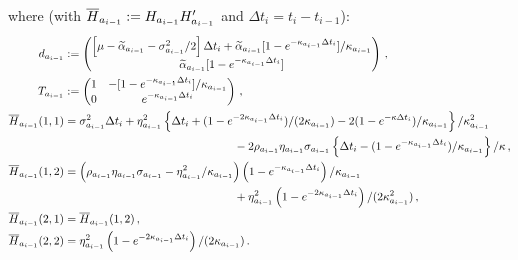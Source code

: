 where (with $\overline{H}_{a_{i-1}} := H_{a_{i-1}}H'_{a_{i-1}}$ and $\Delta t_i = t_i-t_{i-1}$):
\begin{align*}
d_{a_{i-1}} &\eqdef
\begin{pmatrix} \left[\mu- \widetilde{\alpha}_{a_{i-1}} - \sigma^2_{a_{i-1}}/2 \right] \Delta t_i + \widetilde{\alpha}_{a_{i-1}}[1-e^{-\kappa_{a_{i-1}} \Delta t_i}]/\kappa_{a_{i-1}}\\
\widetilde{\alpha}_{a_{i-1}} [1-e^{-\kappa_{a_{i-1}} \Delta t_i}] \end{pmatrix}\eqsp,\\
T_{a_{i-1}} &\eqdef
\begin{pmatrix} 1 & -[1-e^{-\kappa_{a_{i-1}} \Delta t_i}]/\kappa_{a_{i-1}} \\ 0 & e^{-\kappa_{a_{i-1}} \Delta t_i} \end{pmatrix} \eqsp,\\
\barH_{a_{i-1}}(1,1) &= \sigma^2_{a_{i-1}} \Delta t_i + \eta^2_{a_{i-1}}\left\{\Delta t_i + (1-e^{-2\kappa_{a_{i-1}} \Delta t_i})/(2\kappa_{a_{i-1}}) - 2(1-e^{-\kappa \Delta t_i})/\kappa_{a_{i-1}}\right\}/\kappa_{a_{i-1}}^2 \\
&\hspace{5.2cm} - 2\rho_{a_{i-1}} \eta_{a_{i-1}} \sigma_{a_{i-1}}\left\{ \Delta t_i - (1-e^{-\kappa_{a_{i-1}} \Delta t_i})/\kappa_{a_{i-1}} \right\}/\kappa\eqsp, \\
\barH_{a_{i-1}}(1,2) & = \left(\rho_{a_{i-1}} \eta_{a_{i-1}} \sigma_{a_{i-1}}-\eta^2_{a_{i-1}}/\kappa_{a_{i-1}}\right)\left(1-e^{-\kappa_{a_{i-1}}\Delta t_i} \right)/\kappa_{a_{i-1}} \\
&\hspace{5.2cm}+ \eta^2_{a_{i-1}}\left(1-e^{-2\kappa_{a_{i-1}} \Delta t_i} \right)/(2\kappa_{a_{i-1}}^2)\eqsp,\\
\barH_{a_{i-1}}(2,1) &= \barH_{a_{i-1}}(1,2)\eqsp,\\
\barH_{a_{i-1}}(2,2) &= \eta^2_{a_{i-1}}\left( 1-e^{-2\kappa_{a_{i-1}}\Delta t_i} \right)/(2\kappa_{a_{i-1}})\eqsp.
\end{align*}
